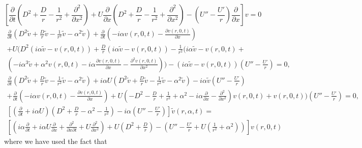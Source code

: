 \documentclass[superscriptaddress, onecolumn, prl]{revtex4}
\begin{document}
\begin{equation}
\label{eq:radial1}
\left[ \frac{\partial}{\partial t} \left(D^2 + \frac{D}{r} - \frac{1}{r^2}  + \frac{\partial^2}{\partial x^2} \right) + U \frac{\partial}{\partial x} \left(D^2 + \frac{D}{r} - \frac{1}{r^2}  + \frac{\partial^2}{\partial x^2} \right) - \left( U'' - \frac{U'}{r} \right) \frac{\partial}{\partial x} \right] v = 0
\end{equation}
\begin{multline}
\frac{\partial}{\partial t} (D^2 \tilde{v} + \frac{D}{r} \tilde{v} - \frac{1}{r^2} \tilde{v} - \alpha^2 \tilde{v}) + \frac{\partial}{\partial t} (- i \alpha v (r, 0, t) - \frac{\partial v(r, 0, t)}{\partial x}) \\ + U (D^2(i \alpha \tilde{v} - v(r,0,t)) + \frac{D}{r}(i \alpha \tilde{v} - v(r,0,t)) - \frac{1}{r^2}(i \alpha \tilde{v} - v(r,0,t) + \\ (- i \alpha^3 \tilde{v} + \alpha^2 v (r, 0, t) - i \alpha \frac{\partial v (r, 0, t) }{\partial x} - \frac{\partial^2 v (r, 0, t)}{\partial x^2})) - (i \alpha \tilde{v} - v (r, 0, t)) \left( U'' - \frac{U'}{r} \right) = 0,
\end{multline}
\begin{multline}
\frac{\partial}{\partial t} (D^2 \tilde{v} + \frac{D}{r} \tilde{v} - \frac{1}{r^2} \tilde{v} - \alpha^2 \tilde{v}) + i \alpha U (D^2 \tilde{v} + \frac{D}{r} \tilde{v} - \frac{1}{r^2} \tilde{v} - \alpha^2 \tilde{v} ) - i \alpha \tilde{v} \left( U'' - \frac{U'}{r} \right) \\ +\frac{\partial}{\partial t} (- i \alpha v (r, 0, t) - \frac{\partial v(r, 0, t)}{\partial x}) +  U( -D^2 - \frac{D}{r} + \frac{1}{r^2} + \alpha^2 - i \alpha \frac{\partial}{\partial x} - \frac{\partial^2}{\partial x^2}) v(r,0,t) + v (r, 0, t)) \left( U'' - \frac{U'}{r} \right) = 0,
\end{multline}
\begin{multline}
\label{eq:radial2}
\left[ \left( \frac{\partial}{\partial t} + i \alpha U \right) \left(D^2 + \frac{D}{r} - \alpha^2 - \frac{1}{r^2} \right) - i \alpha \left( U'' - \frac{U'}{r} \right) \right] \tilde{v}(r, \alpha, t) = \\ \left[ \left(i \alpha \frac{\partial }{\partial t} + i \alpha U \frac{\partial}{\partial x} + \frac{\partial^2}{\partial x \partial t} + U \frac{\partial^2}{\partial x^2} \right)+ U( D^2 + \frac{D}{r}) - \left( U'' - \frac{U'}{r} + U \left(\frac{1}{r^2} + \alpha^2 \right) \right) \right] v(r,0,t)
\end{multline}
where we have used the fact that
\end{document}
